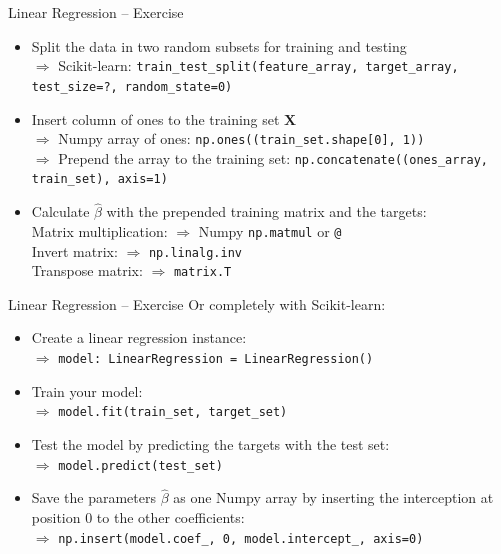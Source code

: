 \documentclass[
                en,
                ]{sdqbeamer}
\begin{document}
\begin{frame}{Linear Regression -- Exercise}
    \begin{itemize}
        \setlength\itemsep{2em}
        \item Split the data in two random subsets for training and testing \\
            $\Rightarrow$ Scikit-learn:
            \texttt{train\_test\_split(feature\_array, target\_array,
            test\_size=?, random\_state=0)}
        \item Insert column of ones to the training set $\boldsymbol{X}$ \\
            $\Rightarrow$ Numpy array of ones:
            \texttt{np.ones((train\_set.shape[0], 1))} \\
            $\Rightarrow$ Prepend the array to the training set:
            \texttt{np.concatenate((ones\_array, train\_set), axis=1)}
        \item Calculate $\hat{\beta}$ with the prepended training matrix and the
            targets: \\
            Matrix multiplication: $\Rightarrow$ Numpy \texttt{np.matmul} or \texttt{@} \\
        Invert matrix: $\Rightarrow$ \texttt{np.linalg.inv} \\
        Transpose matrix: $\Rightarrow$ \texttt{matrix.T}
    \end{itemize}
\end{frame}

\begin{frame}{Linear Regression -- Exercise}
    Or completely with Scikit-learn:

    \vfill

    \begin{itemize}
        \setlength\itemsep{2em}
        \item Create a linear regression instance:  \\
            $\Rightarrow$ \texttt{model: LinearRegression = LinearRegression()}
        \item Train your model: \\
            $\Rightarrow{}$ \texttt{model.fit(train\_set, target\_set)}
        \item Test the model by predicting the targets with the test set: \\
            $\Rightarrow{}$ \texttt{model.predict(test\_set)}
        \item Save the parameters $\hat{\beta}$ as one Numpy array by inserting
            the interception at position $0$ to the other coefficients: \\
            $\Rightarrow{}$ \texttt{np.insert(model.coef\_, 0, model.intercept\_,
            axis=0)}
    \end{itemize}
    
\end{frame}
\end{document}
